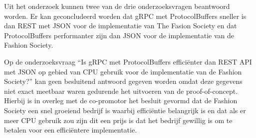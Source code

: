 Uit het onderzoek kunnen twee van de drie onderzoeksvragen beantwoord worden. Er kan geconcludeerd worden dat gRPC met ProtocolBuffers sneller is dan REST met JSON voor de implementatie van The Fasion Society en dat ProtocolBuffers performanter zijn dan JSON voor de implementatie van de Fashion Society.

Op de onderzoeksvraag “Is gRPC met ProtocolBuffers efficiënter dan REST API met JSON op gebied van CPU gebruik voor de implementatie van de Fashion Society?” kan geen besluitend antwoord gegeven worden omdat deze gegevens niet exact meetbaar waren gedurende het uitvoeren van de proof-of-concept. Hierbij is in overleg met de co-promotor het besluit gevormd dat de Fashion Society een snel groeiend bedrijf is waarbij efficiëntie belangrijk is en dat als er meer CPU gebruik zou zijn dit een prijs is dat het bedrijf gewillig is om te betalen voor een efficiëntere implementatie.





